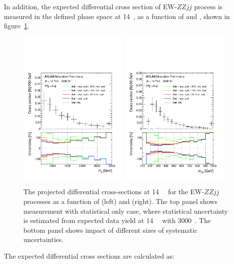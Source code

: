 In addition, the expected differential cross section of EW-$ZZjj$ process is measured in the defined phase space at 14~\tev,
as a function of \mzz and \mjj, shown in figure~\ref{fig:xs_mjj_mzz}.
\begin{figure}[!htbp]
\centering
\includegraphics[width=0.48\textwidth]{figures/VBSZZ/hllhc/TagJJM_final_all_linear.pdf}
\includegraphics[width=0.48\textwidth]{figures/VBSZZ/hllhc/MZZ_all_linear.pdf}
\caption{
The projected differential cross-sections at 14~\tev~ for the EW-$ZZjj$ processes as a function of \mjj (left) and \mzz (right).
The top panel shows measurement with statistical only case,
where statistical uncertainty is estimated from expected data yield at 14~\tev~ with 3000~\ifb.
The bottom panel shows impact of different sizes of systematic uncertainties.
}
\label{fig:xs_mjj_mzz}
\end{figure}
The expected differential cross sections are calculated as:
